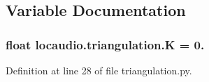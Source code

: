 \subsection{Variable Documentation}
\hypertarget{namespacelocaudio_1_1triangulation_ac85bcbed961d15baa586ddc0192860bb}{
\subsubsection[{K}]{\setlength{\rightskip}{0pt plus 5cm}float locaudio.\-triangulation.\-K = 0.}}\label{namespacelocaudio_1_1triangulation_ac85bcbed961d15baa586ddc0192860bb}


Definition at line 28 of file triangulation.\-py.

